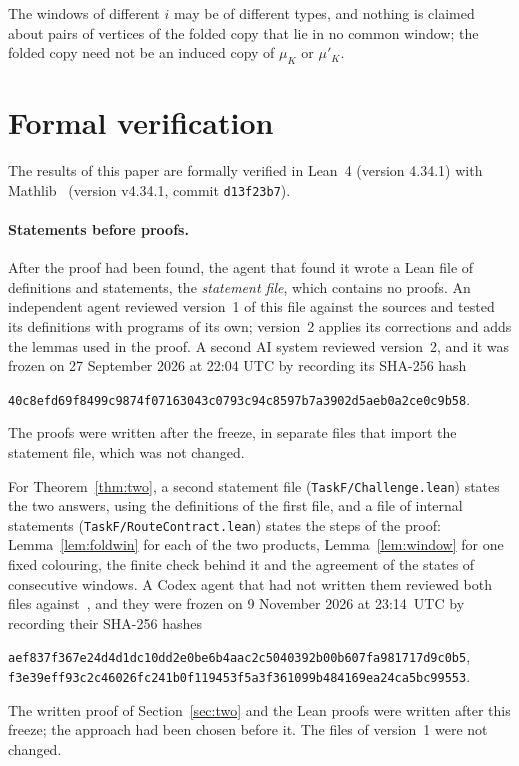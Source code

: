 \documentclass[11pt]{article}
\theoremstyle{remark}
\begin{document}
The windows of different $i$ may be of different types, and nothing is claimed
about pairs of vertices of the folded copy that lie in no common window; the
folded copy need not be an induced copy of $\mu_K$ or $\mu'_K$.

\section{Formal verification}\label{sec:lean}

The results of this paper are formally verified in Lean~4 (version 4.34.1)
with Mathlib~\cite{mathlib} (version v4.34.1, commit \texttt{d13f23b7}).

\paragraph{Statements before proofs.}
After the proof had been found, the agent that found it wrote a Lean file of
definitions and statements, the \emph{statement file}, which contains no
proofs. An independent agent reviewed version~1 of this file against the
sources and tested its definitions with programs of its own; version~2 applies
its corrections and adds the lemmas used in the proof. A second AI system
reviewed version~2, and it was frozen on 27 September 2026 at 22:04 UTC by
recording its SHA-256 hash
\begin{center}\small
\texttt{40c8efd69f8499c9874f07163043c0793c94c8597b7a3902d5aeb0a2ce0c9b58}.
\end{center}
The proofs were written after the freeze, in separate files that import the
statement file, which was not changed.

For Theorem~\ref{thm:two}, a second statement file
(\texttt{TaskF/Challenge.lean}) states the two answers, using the definitions of
the first file, and a file of internal statements
(\texttt{TaskF/RouteContract.lean}) states the steps of the proof:
Lemma~\ref{lem:foldwin} for each of the two products, Lemma~\ref{lem:window}
for one fixed colouring, the finite check behind it and the agreement of the
states of consecutive windows. A Codex agent that had not written them reviewed
both files against~\cite{alsh}, and they were frozen on 9 November 2026 at
23:14~UTC by recording their SHA-256 hashes
\begin{center}\small
\texttt{aef837f367e24d4d1dc10dd2e0be6b4aac2c5040392b00b607fa981717d9c0b5},\\
\texttt{f3e39eff93c2c46026fc241b0f119453f5a3f361099b484169ea24ca5bc99553}.
\end{center}
The written proof of Section~\ref{sec:two} and the Lean proofs were written after
this freeze; the approach had been chosen before it. The files of version~1 were
not changed.
\end{document}
